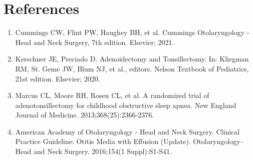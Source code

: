 \section*{References}
\begin{enumerate}
  \item Cummings CW, Flint PW, Haughey BH, et al. Cummings Otolaryngology - Head and Neck Surgery, 7th edition. Elsevier; 2021.
  \item Kerschner JE, Preciado D. Adenoidectomy and Tonsillectomy. In: Kliegman RM, St. Geme JW, Blum NJ, et al., editors. Nelson Textbook of Pediatrics, 21st edition. Elsevier; 2020.
  \item Marcus CL, Moore RH, Rosen CL, et al. A randomized trial of adenotonsillectomy for childhood obstructive sleep apnea. New England Journal of Medicine. 2013;368(25):2366-2376.
  \item American Academy of Otolaryngology - Head and Neck Surgery. Clinical Practice Guideline: Otitis Media with Effusion (Update). Otolaryngology--Head and Neck Surgery. 2016;154(1 Suppl):S1-S41.
\end{enumerate}

\clearpage
